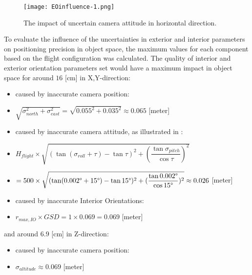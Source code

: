 \begin{figure}%
	\centering
	\texttt{[image: EOinfluence-1.png]}
	\caption{\small The impact of uncertain camera attitude in horizontal direction.}
	\label{fig:EOinfluence-1}
\end{figure}
\clearpage
To evaluate the influence of the uncertainties in exterior and interior parameters on positioning precision in object space, the maximum values for each component based on the flight configuration was calculated.
The quality of interior and exterior orientation parameters set would have a maximum impact in object space for around $16$ [cm] in X,Y-direction:
\begin{itemize}
      \item caused by inaccurate camera position: 
      \item [] $\sqrt{\sigma_{north}^2+\sigma_{east}^2}=\sqrt{0.055^2+0.035^2}\approx0.065$ [meter]
      \item caused by inaccurate camera attitude, as illustrated in :
      \item [] $ H_{flight}\times\sqrt{(\tan(\sigma_{roll}+\tau)-\tan\tau)^2+(\dfrac{\tan\sigma_{pitch}}{\cos\tau})^2}$
      \item [] $=500\times\sqrt{(\tan(0.002\degree+15\degree)-\tan15\degree)^2+(\dfrac{\tan0.002\degree}{\cos15\degree})^2}\approx0.026$ [meter]
      \item caused by inaccurate Interior Orientations:
      \item [] $r_{max, IO}\times GSD=1\times0.069=0.069$ [meter]
\end{itemize}
and around $6.9$ [cm] in Z-direction:
\begin{itemize}
      \item caused by inaccurate camera position:
      \item [] $\sigma_{altitude}\approx0.069$ [meter]
\end{itemize}

